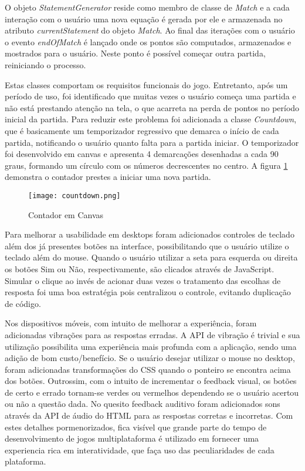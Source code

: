 O objeto \textit{StatementGenerator} reside como membro de classe de
\textit{Match} e a cada interação com o usuário uma nova equação
é gerada por ele e armazenada no atributo \textit{currentStatement}
do objeto \textit{Match}. Ao final das iterações com o usuário o
evento \textit{endOfMatch} é lançado onde os pontos são computados,
armazenados e mostrados para o usuário. Neste ponto é possível
começar outra partida, reiniciando o processo.

Estas classes comportam os requisitos funcionais do jogo. Entretanto,
após um período de uso, foi identificado que muitas vezes o usuário
começa uma partida e não está prestando atenção na tela, o
que acarreta na perda de pontos no período inicial da partida. Para
reduzir este problema foi adicionada a classe \textit{Countdown},
que é basicamente um temporizador regressivo que demarca o início
de cada partida, notificando o usuário quanto falta para a partida
iniciar. O temporizador foi desenvolvido em canvas e apresenta 4
demarcações desenhadas a cada 90 graus, formando um círculo com
os números decrescentes no centro. A figura
\ref{fig:counter} demonstra o contador prestes a iniciar uma nova
partida.

\begin{figure}[H]
    \centering
    \texttt{[image: countdown.png]}
	\caption{Contador em Canvas}
    \label{fig:counter}
\end{figure}

Para melhorar a usabilidade em desktops foram adicionados controles de
teclado além dos já presentes botões na interface, possibilitando que
o usuário utilize o teclado além do mouse. Quando o usuário utilizar
a seta para esquerda ou direita os botões Sim ou Não, respectivamente,
são clicados através de JavaScript. Simular o clique ao invés de
acionar duas vezes o tratamento das escolhas de resposta foi uma boa
estratégia pois centralizou o controle, evitando duplicação de
código.

Nos dispositivos móveis, com intuito de melhorar a experiência, foram
adicionadas vibrações para as respostas erradas. A API de vibração
é trivial e sua utilização possibilita uma experiência mais
profunda com a aplicação, sendo uma adição de bom custo/benefício.
Se o usuário desejar utilizar o mouse no desktop, foram adicionadas
transformações do CSS quando o ponteiro se encontra acima dos
botões. Outrossim, com o intuito de incrementar o feedback visual, os botões de certo e errado
tornam-se verdes ou vermelhos dependendo se o usuário acertou ou não
a questão dada. No quesito feedback auditivo foram adicionados sons
através da API de áudio do HTML para as respostas corretas e incorretas. Com estes
detalhes pormenorizados, fica visível que grande parte do tempo de
desenvolvimento de jogos multiplataforma é utilizado em fornecer uma
experiencia rica em interatividade, que faça uso das peculiaridades de
cada plataforma.

